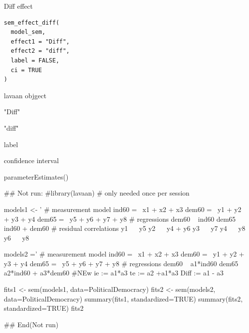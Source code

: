 \documentclass[a4paper]{book}
\begin{document}
%
\begin{Description}
Diff effect
\end{Description}
%
\begin{Usage}
\begin{verbatim}
sem_effect_diff(
  model_sem,
  effect1 = "Diff",
  effect2 = "diff",
  label = FALSE,
  ci = TRUE
)
\end{verbatim}
\end{Usage}
%
\begin{Arguments}
\begin{ldescription}
\item[\code{model\_sem}] lavaan objgect

\item[\code{effect1}] "Diff"

\item[\code{effect2}] "diff"

\item[\code{label}] label

\item[\code{ci}] confidence interval
\end{ldescription}
\end{Arguments}
%
\begin{Value}
parameterEstimates()
\end{Value}
%
\begin{Examples}
\begin{ExampleCode}

## Not run: 
#library(lavaan) # only needed once per session

models1 <- '
  # measurement model
    ind60 =~ x1 + x2 + x3
    dem60 =~ y1 + y2 + y3 + y4
    dem65 =~ y5 + y6 + y7 + y8
    # regressions
    dem60 ~ ind60
    dem65 ~ ind60 + dem60
      # residual correlations
    y1 ~~ y5
    y2 ~~ y4 + y6
    y3 ~~ y7
    y4 ~~ y8
    y6 ~~ y8

models2 ='
  # measurement model
    ind60 =~ x1 + x2 + x3
    dem60 =~ y1 + y2 + y3 + y4
    dem65 =~ y5 + y6 + y7 + y8
     # regressions
    dem60 ~ a1*ind60
    dem65 ~ a2*ind60 + a3*dem60
 #NEw
   ie := a1*a3
   te := a2 +a1*a3
   Diff := a1 - a3




fits1 <- sem(models1, data=PoliticalDemocracy)
fits2 <- sem(models2, data=PoliticalDemocracy)
summary(fits1, standardized=TRUE)
summary(fits2, standardized=TRUE)
fits2 %

## End(Not run)
\end{ExampleCode}
\end{Examples}
\end{document}
